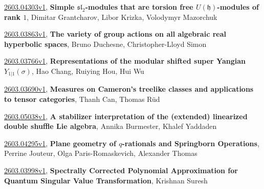 \documentclass[9pt, a4paper]{article}
\theoremstyle{plain}
\theoremstyle{definition}
\theoremstyle{remark}
\newcommand{\arxiv}[3]{\href{https://arxiv.org/abs/#1}{#1}, \textbf{\textcolor{arxivblue}{#2}}, #3}
\begin{document}
\arxiv{2603.04303v1}{Simple $\mathfrak{sl}_2$-modules that are torsion free $U(\mathfrak{h})$-modules of rank $1$}{Dimitar Grantcharov, Libor Krizka, Volodymyr Mazorchuk}

\arxiv{2603.03863v1}{The variety of group actions on all algebraic real hyperbolic spaces}{Bruno Duchesne, Christopher-Lloyd Simon}

\arxiv{2603.03766v1}{Representations of the modular shifted super Yangian $Y_{1|1}(σ)$}{Hao Chang, Ruiying Hou, Hui Wu}

\arxiv{2603.03690v1}{Measures on Cameron's treelike classes and applications to tensor categories}{Thanh Can, Thomas Rüd}

\arxiv{2603.05038v1}{A stabilizer interpretation of the (extended) linearized double shuffle Lie algebra}{Annika Burmester, Khalef Yaddaden}

\arxiv{2603.04295v1}{Plane geometry of $q$-rationals and Springborn Operations}{Perrine Jouteur, Olga Paris-Romaskevich, Alexander Thomas}

\arxiv{2603.03998v1}{Spectrally Corrected Polynomial Approximation for Quantum Singular Value Transformation}{Krishnan Suresh}

\end{document}
